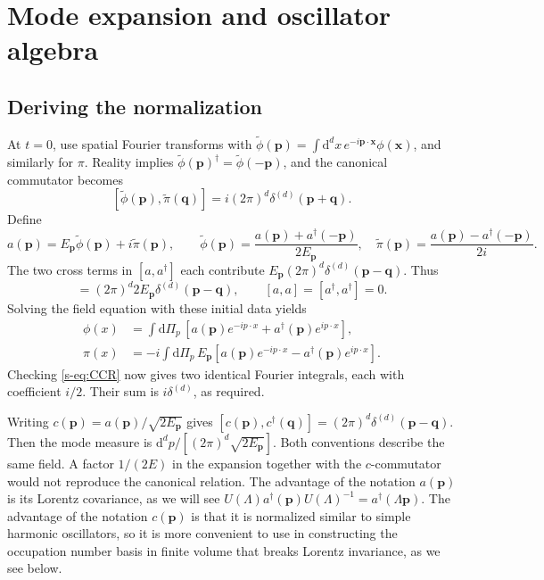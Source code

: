 \documentclass[11pt]{article}
\newcommand{\dd}{\mathrm{d}}
\begin{document}
\section{Mode expansion and oscillator algebra}
\subsection{Deriving the normalization}

At \(t=0\), use spatial Fourier transforms with
\(\widetilde\phi(\bm p)=\int\dd^d x\,e^{-i\bm p\cdot\bm x}\phi(\bm x)\),
and similarly for \(\pi\). Reality implies
\(\widetilde\phi(\bm p)^\dagger=\widetilde\phi(-\bm p)\), and the canonical
commutator becomes
\[
 [\widetilde\phi(\bm p),\widetilde\pi(\bm q)]
   =i(2\pi)^d\delta^{(d)}(\bm p+\bm q).
\]
Define
\begin{equation}
 a(\bm p)=E_{\bm p}\widetilde\phi(\bm p)+i\widetilde\pi(\bm p),\qquad
 \widetilde\phi(\bm p)=\frac{a(\bm p)+a^\dagger(-\bm p)}{2E_{\bm p}},
 \quad \widetilde\pi(\bm p)=\frac{a(\bm p)-a^\dagger(-\bm p)}{2i}.
 \label{s-eq:inverse}
\end{equation}
The two cross terms in \([a,a^\dagger]\) each contribute
\(E_{\bm p}(2\pi)^d\delta^{(d)}(\bm p-\bm q)\). Thus
\begin{equation}
 [a(\bm p),a^\dagger(\bm q)]=(2\pi)^d2E_{\bm p}\delta^{(d)}(\bm p-\bm q),
 \qquad [a,a]=[a^\dagger,a^\dagger]=0.
 \label{s-eq:modeCCR}
\end{equation}
Solving the field equation with these initial data yields
\begin{align}
 \phi(x)&=\int\dd\Pi_p\,[a(\bm p)e^{-ip\cdot x}+a^\dagger(\bm p)e^{ip\cdot x}],
 \label{s-eq:realmode}\\
 \pi(x)&=-i\int\dd\Pi_p\,E_{\bm p}
 [a(\bm p)e^{-ip\cdot x}-a^\dagger(\bm p)e^{ip\cdot x}].
 \label{s-eq:pimode}
\end{align}
Checking \eqref{s-eq:CCR} now gives two identical Fourier integrals, each
with coefficient \(i/2\). Their sum is \(i\delta^{(d)}\), as required.

\begin{remarkbox}
Writing \(c(\bm p)=a(\bm p)/\sqrt{2E_{\bm p}}\) gives
\([c(\bm p),c^\dagger(\bm q)]=(2\pi)^d\delta^{(d)}(\bm p-\bm q)\).
Then the mode measure is
\(\dd^d p/[(2\pi)^d\sqrt{2E_{\bm p}}]\).
Both conventions describe the same field. A factor \(1/(2E)\) in the
expansion together with the \(c\)-commutator would not reproduce the
canonical relation. The advantage of the notation $a(\bm p)$ is its Lorentz covariance, as we will see $U(\Lambda)a^\dagger(\bm p) U(\Lambda)^{-1}=a^\dagger(\Lambda \bm p)$. The advantage of the notation $c(\bm p)$ is that it is normalized similar to simple harmonic oscillators, so it is more convenient to use in constructing the occupation number basis in finite volume that breaks Lorentz invariance, as we see below.
\end{remarkbox}
\end{document}
